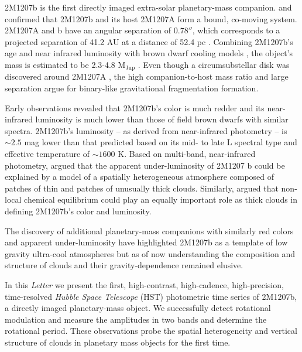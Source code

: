 \documentclass[apj]{emulateapj}
\begin{document}
2M1207b \citet{Chauvin2004} is the first directly imaged extra-solar
planetary-mass companion. \citet{Chauvin2005} and \citet{Song2006}
confirmed that 2M1207b and its host 2M1207A form a bound, co-moving
system. 2M1207A and b have an angular separation of $0.78''$, which
corresponds to a projected separation of 41.2 AU at a distance of 52.4
pc \citep[e.g.][]{Ducourant2008}. Combining 2M1207b's age and near
infrared luminosity with brown dwarf cooling models
\citep[e.g.][]{Baraffe2003}, the object's mass is estimated to be
2.3-4.8 M$_{\mathrm{Jup}}$ \citep{Barman2011b}. Even though a
circumsubstellar disk was discovered around 2M1207A
\citep[][]{Sterzik2004}, the high companion-to-host mass ratio and
large separation argue for binary-like gravitational fragmentation
formation\citep{Mohanty2007}.

Early observations revealed that 2M1207b's color is much redder and
its near-infrared luminosity is much lower than those of field brown
dwarfs with similar spectra\citep[e.g][]{Mohanty2007, Skemer2011,
  Barman2011b}. 2M1207b's luminosity -- as derived from near-infrared
photometry -- is $\sim2.5$ mag lower than that predicted based on its
mid- to late L spectral type and effective temperature of $\sim 1600$
 K\citep{Patience2010}.  Based on multi-band, near-infrared photometry,
\citet{Skemer2011} argued that the apparent under-luminosity of 2M1207
b could be explained by a model of a spatially heterogeneous atmosphere
composed of patches of thin and patches of unusually thick clouds.
Similarly, \cite{Barman2011b} argued that non-local chemical
equilibrium could play an equally important role as thick clouds in
defining 2M1207b's color and luminosity.

The discovery of additional planetary-mass companions with similarly
red colors and apparent under-luminosity have highlighted 2M1207b as a
template of low gravity ultra-cool atmospheres but as of now
understanding the composition and structure of clouds and their
gravity-dependence remained elusive.


In this {\em Letter} we present the first, high-contrast, high-cadence,
high-precision, time-resolved {\em Hubble Space Telescope} (HST)
photometric time series of 2M1207b, a directly imaged planetary-mass
object. We successfully detect rotational modulation and measure the
amplitudes in two bands and determine the rotational period. These
observations probe the spatial heterogeneity and vertical structure of
clouds in planetary mass objects for the first time.
\end{document}
